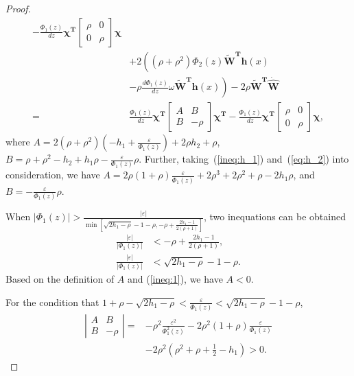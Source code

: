 \documentclass{ifacconf}
\begin{document}
\begin{proof}
\begin{align}
-\frac{\Phi_1(z)}{dz}\bm{\chi}^{\bm{T}}
\left[
\begin{array}{cc}
     \rho&0  \\
     0& \rho
\end{array}
\right] 
\bm{\chi} \nonumber \\
~&+2\left((\rho+\rho^2)\Phi_2(z)\bm{\tilde{W}}^{\bm{T}}\bm{h}(x)\right.
\nonumber \\
~&\left.-\rho\frac{d \Phi_1(z)}{dz}\omega \bm{\tilde{W}}^{\bm{T}}\bm{h}(x)\right)
-2\rho\bm{\tilde{W}}^{\bm{T}}\dot{\bm{\hat{W}}} \nonumber \\
\label{eq:proof, dot V}
=& \frac{\Phi_1(z)}{dz} 
\bm{\chi}^{\bm{T}}
\left[
\begin{array}{cc}
     A & B \\
     B & -\rho 
\end{array}
\right]{\bm{\chi}}^{\bm{T}} 
-\frac{\Phi_1(z)}{dz}\bm{\chi}^{\bm{T}}
\left[
\begin{array}{cc}
     \rho&0  \\
     0& \rho
\end{array}
\right] 
\bm{\chi},
\end{align}
where $A=2(\rho+\rho^2)(-h_1+\frac{\varepsilon}{\Phi_1(z)})+2\rho h_2+\rho$, $B=\rho +\rho^2 -h_2 +h_1 \rho -\frac{\varepsilon}{\Phi_1(z)}\rho$. Further, taking~(\ref{ineq:h_1}) and~(\ref{eq:h_2}) into consideration, we have $A=2\rho (1+\rho)\frac{\varepsilon}{\Phi_1(z)}+2\rho^3+2\rho^2+\rho-2h_1\rho$, and $B=-\frac{\varepsilon}{\Phi_1(z)}\rho$.

When $|\Phi_1(z)|>\frac{|\varepsilon|}{\min \left[\sqrt{2h_1-\rho }-1-\rho, -\rho+\frac{2h_1-1}{2(\rho+1)} \right]}$, two inequations can be obtained
\begin{align} \label{ineq:1}
    \frac{|\varepsilon|}{|\Phi_1(z)|}&<-\rho+\frac{2h_1-1}{2(\rho+1)}, \\
    \frac{|\varepsilon|}{|\Phi_1(z)|}&<\sqrt{2h_1-\rho}-1-\rho.
\end{align}
Based on the definition of $A$ and (\ref{ineq:1}), we have $A < 0$.

For the condition that $1+\rho-\sqrt{2h_1-\rho}<\frac{\varepsilon}{\Phi_1(z)}<\sqrt{2h_1-\rho}-1-\rho$,
\begin{align}
    \left|
\begin{array}{cc}
    A & B \\
    B & -\rho
\end{array}
    \right|=&-\rho^2\frac{\varepsilon^2}{\Phi_1^2(z)}-2\rho^2(1+\rho)\frac{\varepsilon}{\Phi_1(z)}
    \nonumber\\
    ~&-2\rho^2(\rho^2+\rho+\frac{1}{2}-h_1) 
    > 0.
\end{align}


\end{proof}
\end{document}

